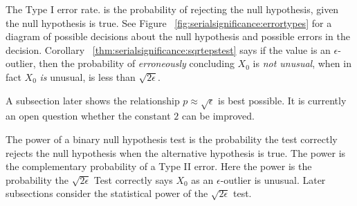 \documentclass[12pt]{article}
\begin{document}
\begin{remark}
    The Type I error rate.%
    is the probability of rejecting the null hypothesis, given the null
    hypothesis is true.  See Figure~%
    \ref{fig:serialsignificance:errortypes} for a diagram of possible
    decisions about the null hypothesis and possible errors in the
    decision.  Corollary~%
    \ref{thm:serialsignificance:sqrtepstest} says if the value is an \(
    \epsilon \)-outlier, then the probability of \emph{erroneously}
    concluding \( X_0 \) is \emph{not unusual}, when in fact \( X_0 \)
    \emph{is} unusual, is less than \( \sqrt{2 \epsilon } \).

    A subsection later shows the relationship \( p \approx \sqrt{\epsilon}
    \) is best possible.  It is currently an open question whether the
    constant \( 2 \) can be improved.
\end{remark}

\begin{remark}
    The power%
    of a binary null hypothesis test is the probability the test
    correctly rejects the null hypothesis when the alternative
    hypothesis is true.  The power is the complementary probability of a
    Type II error.  Here the power is the probability the \( \sqrt{2\epsilon}
    \) Test correctly says \( X_0 \) as an \( \epsilon \)-outlier is
    unusual.  Later subsections consider the statistical power of the \(
    \sqrt{2\epsilon} \) test.
\end{remark}
\end{document}
